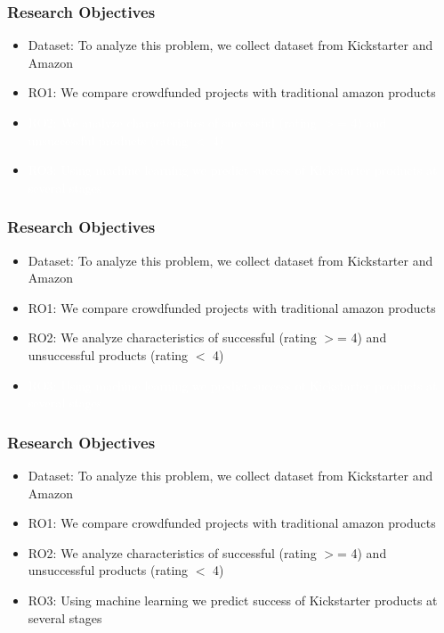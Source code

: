 \documentclass[9pt]{beamer}
\begin{document}
\begin{frame}
	\frametitle{Research Objectives}
	\begin{itemize}[label=\textcolor{blue}{\textbullet}]
		\item{Dataset: To analyze this problem, we collect dataset from Kickstarter and Amazon}
		\item{RO1: We compare crowdfunded projects with traditional amazon products}
		\item[\textcolor{white}{\textbullet}]{\textcolor{white}{RO2: We analyze characteristics of successful (rating $>$= 4) and unsuccessful products (rating $<$ 4)}}
		\item[\textcolor{white}{\textbullet}]{\textcolor{white}{RO3: Using machine learning we predict success of Kickstarter products at several stages}}
	\end{itemize}
\end{frame}


\begin{frame}
	\frametitle{Research Objectives}
	\begin{itemize}[label=\textcolor{blue}{\textbullet}]
		\item{Dataset: To analyze this problem, we collect dataset from Kickstarter and Amazon}
		\item{RO1: We compare crowdfunded projects with traditional amazon products}
		\item{RO2: We analyze characteristics of successful (rating $>$= 4) and unsuccessful products (rating $<$ 4)}
		\item[\textcolor{white}{\textbullet}]{\textcolor{white} {RO3: Using machine learning we predict success of Kickstarter products at several stages}}
	\end{itemize}
\end{frame}

\begin{frame}
\frametitle{Research Objectives}
	\begin{itemize}[label=\textcolor{blue}{\textbullet}]
		\item{Dataset: To analyze this problem, we collect dataset from Kickstarter and Amazon}
		\item{RO1: We compare crowdfunded projects with traditional amazon products}
		\item{RO2: We analyze characteristics of successful (rating $>$= 4) and unsuccessful products (rating $<$ 4)}
		\item{RO3: Using machine learning we predict success of Kickstarter products at several stages}
	\end{itemize}
\end{frame}
\end{document}
